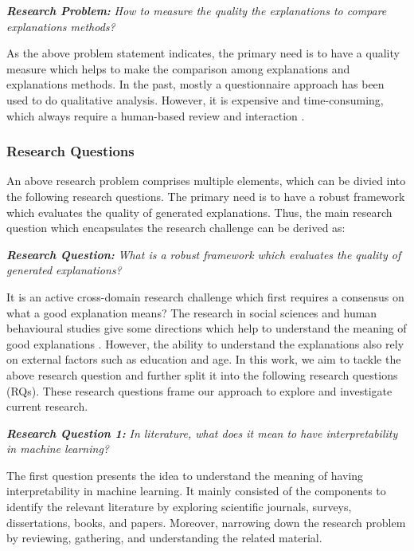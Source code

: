 \documentclass[english]{tktltiki2}
\theoremstyle{definition}
\theoremstyle{remark}
\begin{document}
\textbf{\textit{Research Problem:}}
\textit{How to measure the quality the explanations to compare explanations methods?}

As the above problem statement indicates, the primary need is to have a quality measure which helps to make the comparison among explanations and explanations methods. In the past, mostly a questionnaire approach has been used to do qualitative analysis. However, it is expensive and time-consuming, which always require a human-based review and interaction \citep{molnarinterpretable, honegger2018shedding, ribeiro2016should, lundberg2017unified}.

\subsubsection{Research Questions} %
An above research problem comprises multiple elements, which can be divied into the following research questions. The primary need is to have a robust framework which evaluates the quality of generated explanations. Thus, the main research question which encapsulates the research challenge can be derived as:

\textbf{\textit{Research Question:}}
\textit{What is a robust framework which evaluates the quality of generated explanations?} %

It is an active cross-domain research challenge which first requires a consensus on what a good explanation means?  The research in social sciences and human behavioural studies give some directions which help to understand the meaning of good explanations \citep{lipton2016mythos, miller2018explanation}. However, the ability to understand the explanations also rely on external factors such as education and age. In this work, we aim to tackle the above research question and further split it into the following research questions (RQs). These research questions frame our approach to explore and investigate current research.

\textbf{\textit{Research Question 1:}}
\textit{In literature, what does it mean to have interpretability in machine learning?}

The first question presents the idea to understand the meaning of having interpretability in machine learning. It mainly consisted of the components to identify the relevant literature by exploring scientific journals, surveys, dissertations, books, and papers. Moreover, narrowing down the research problem by reviewing, gathering, and understanding the related material.
\end{document}
